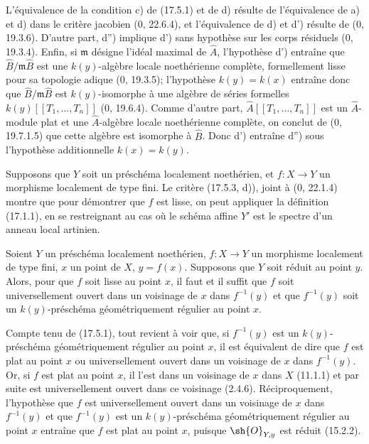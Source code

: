L'équivalence de la condition c) de (17.5.1) et de d) résulte de l'équivalence de a) et d) dans le critère jacobien (0, 22.6.4), et l'équivalence de d) et d') résulte de (0, 19.3.6). D'autre part, d'') implique d') sans hypothèse sur les corps résiduels (0, 19.3.4). Enfin, si $\mathfrak m$ désigne l'idéal maximal de $\widehat A$, l'hypothèse d') entraîne que $\widehat B/\mathfrak m\widehat B$ est une $k(y)$-algèbre locale noethérienne complète, formellement lisse pour sa topologie adique (0, 19.3.5); l'hypothèse $k(y)=k(x)$ entraîne donc que $\widehat B/\mathfrak m\widehat B$ est $k(y)$-isomorphe à une algèbre de séries formelles $k(y)[[T_1,\ldots,T_n]]$ (0, 19.6.4). Comme d'autre part, $\widehat A[[T_1,\ldots,T_n]]$ est un $\widehat A$-module plat et une $\widehat A$-algèbre locale noethérienne complète, on conclut de (0, 19.7.1.5) que cette algèbre est isomorphe à $\widehat B$. Donc d') entraîne d'') sous l'hypothèse additionnelle $k(x)=k(y)$.

\begin{remark}[17.5.4]
\label{IV.17.5.4}
Supposons que $Y$ soit un préschéma localement noethérien, et $f:X\to Y$ un morphisme localement de type fini. Le critère (17.5.3, d)), joint à (0, 22.1.4) montre que pour démontrer que $f$ est lisse, on peut appliquer la définition (17.1.1), en se restreignant au cas où le schéma affine $Y'$ est le spectre d'un anneau local artinien.
\end{remark}

\begin{proposition}[17.5.5]
\label{IV.17.5.5}
Soient $Y$ un préschéma localement noethérien, $f:X\to Y$ un morphisme localement de type fini, $x$ un point de $X$, $y=f(x)$. Supposons que $Y$ soit réduit au point $y$. Alors, pour que $f$ soit lisse au point $x$, il faut et il suffit que $f$ soit universellement ouvert dans un voisinage de $x$ dans $f^{-1}(y)$ et que $f^{-1}(y)$ soit un $k(y)$-préschéma géométriquement régulier au point $x$.
\end{proposition}

Compte tenu de (17.5.1), tout revient à voir que, si $f^{-1}(y)$ est un $k(y)$-préschéma géométriquement régulier au point $x$, il est équivalent de dire que $f$ est plat au point $x$ ou universellement ouvert dans un voisinage de $x$ dans $f^{-1}(y)$. Or, si $f$ est plat au point $x$, il l'est dans un voisinage de $x$ dans $X$ (11.1.1) et par suite est universellement ouvert dans ce voisinage (2.4.6). Réciproquement, l'hypothèse que $f$ est universellement ouvert dans un voisinage de $x$ dans $f^{-1}(y)$ et que $f^{-1}(y)$ est un $k(y)$-préschéma géométriquement régulier au point $x$ entraîne que $f$ est plat au point $x$, puisque $\sh{O}_{Y,y}$ est réduit (15.2.2).

